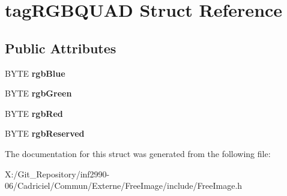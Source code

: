 \hypertarget{structtag_r_g_b_q_u_a_d}{\section{tag\-R\-G\-B\-Q\-U\-A\-D Struct Reference}
\label{structtag_r_g_b_q_u_a_d}
}
\subsection*{Public Attributes}
\begin{DoxyCompactItemize}
\item 
\hypertarget{structtag_r_g_b_q_u_a_d_ad99c50770a73c6fae3ee1ea627da1c60}{B\-Y\-T\-E {\bfseries rgb\-Blue}}\label{structtag_r_g_b_q_u_a_d_ad99c50770a73c6fae3ee1ea627da1c60}

\item 
\hypertarget{structtag_r_g_b_q_u_a_d_a4dae0a7db2f4d432cb4da3de4ef337bd}{B\-Y\-T\-E {\bfseries rgb\-Green}}\label{structtag_r_g_b_q_u_a_d_a4dae0a7db2f4d432cb4da3de4ef337bd}

\item 
\hypertarget{structtag_r_g_b_q_u_a_d_aa143fcd3ff08a04b152bee9d410821a6}{B\-Y\-T\-E {\bfseries rgb\-Red}}\label{structtag_r_g_b_q_u_a_d_aa143fcd3ff08a04b152bee9d410821a6}

\item 
\hypertarget{structtag_r_g_b_q_u_a_d_a2758aec56e37d4f3f5fde511a58f4f82}{B\-Y\-T\-E {\bfseries rgb\-Reserved}}\label{structtag_r_g_b_q_u_a_d_a2758aec56e37d4f3f5fde511a58f4f82}

\end{DoxyCompactItemize}


The documentation for this struct was generated from the following file\-:\begin{DoxyCompactItemize}
\item 
X\-:/\-Git\-\_\-\-Repository/inf2990-\/06/\-Cadriciel/\-Commun/\-Externe/\-Free\-Image/include/Free\-Image.\-h\end{DoxyCompactItemize}
